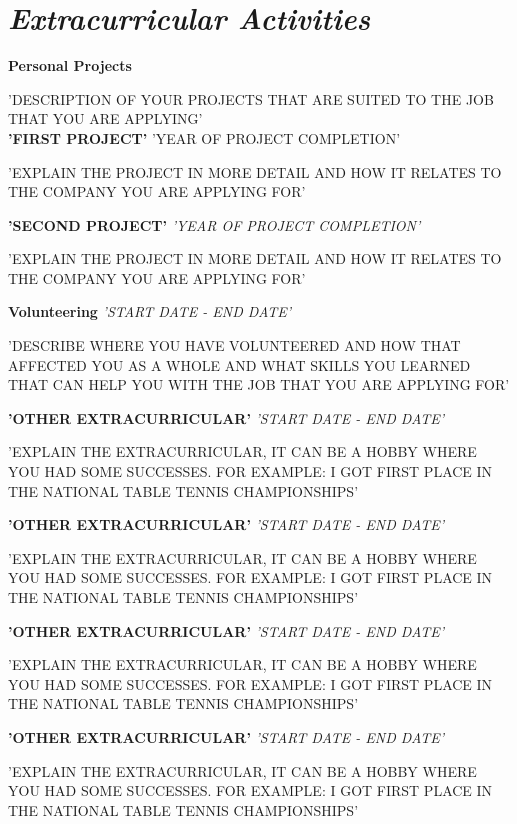 \documentclass{memoir}
\begin{document}
\section{\textit{Extracurricular Activities}}
\vspace{1mm}
\begin{adjustwidth}{0.5cm}{}
    \textbf{Personal Projects}
    \begin{adjustwidth}{0.5cm}{}
        'DESCRIPTION OF YOUR PROJECTS THAT ARE SUITED TO THE JOB THAT YOU ARE APPLYING'
        \vspace{1.5mm}\\
        {\textbf{'FIRST PROJECT'}} \hfill {'YEAR OF PROJECT COMPLETION'}
        \begin{adjustwidth}{0.5cm}{}
            'EXPLAIN THE PROJECT IN MORE DETAIL AND HOW IT RELATES TO THE COMPANY YOU ARE APPLYING FOR'
        \end{adjustwidth}
        {\textbf{'SECOND PROJECT'}} \hfill {\textit{'YEAR OF PROJECT COMPLETION'}}
        \begin{adjustwidth}{0.5cm}{}
            'EXPLAIN THE PROJECT IN MORE DETAIL AND HOW IT RELATES TO THE COMPANY YOU ARE APPLYING FOR'
        \end{adjustwidth}
    \end{adjustwidth}
        {\textbf{Volunteering}} \hfill {\textit{'START DATE - END DATE'}}
        \begin{adjustwidth}{0.5cm}{}
           'DESCRIBE WHERE YOU HAVE VOLUNTEERED AND HOW THAT AFFECTED YOU AS A WHOLE AND WHAT SKILLS YOU LEARNED THAT CAN HELP YOU WITH THE JOB THAT YOU ARE APPLYING FOR'
        \end{adjustwidth}
        {\textbf{'OTHER EXTRACURRICULAR'}} \hfill {\textit{'START DATE - END DATE'}}
        \begin{adjustwidth}{0.5cm}{}
            'EXPLAIN THE EXTRACURRICULAR, IT CAN BE A HOBBY WHERE YOU HAD SOME SUCCESSES. FOR EXAMPLE: I GOT FIRST PLACE IN THE NATIONAL TABLE TENNIS CHAMPIONSHIPS'
        \end{adjustwidth}
        {\textbf{'OTHER EXTRACURRICULAR'}} \hfill {\textit{'START DATE - END DATE'}}
        \begin{adjustwidth}{0.5cm}{}
            'EXPLAIN THE EXTRACURRICULAR, IT CAN BE A HOBBY WHERE YOU HAD SOME SUCCESSES. FOR EXAMPLE: I GOT FIRST PLACE IN THE NATIONAL TABLE TENNIS CHAMPIONSHIPS'
        \end{adjustwidth}
       {\textbf{'OTHER EXTRACURRICULAR'}} \hfill {\textit{'START DATE - END DATE'}}
        \begin{adjustwidth}{0.5cm}{}
            'EXPLAIN THE EXTRACURRICULAR, IT CAN BE A HOBBY WHERE YOU HAD SOME SUCCESSES. FOR EXAMPLE: I GOT FIRST PLACE IN THE NATIONAL TABLE TENNIS CHAMPIONSHIPS'
        \end{adjustwidth}
        {\textbf{'OTHER EXTRACURRICULAR'}} \hfill {\textit{'START DATE - END DATE'}}
        \begin{adjustwidth}{0.5cm}{}
            'EXPLAIN THE EXTRACURRICULAR, IT CAN BE A HOBBY WHERE YOU HAD SOME SUCCESSES. FOR EXAMPLE: I GOT FIRST PLACE IN THE NATIONAL TABLE TENNIS CHAMPIONSHIPS'
        \end{adjustwidth}
\end{adjustwidth}
\end{document}
